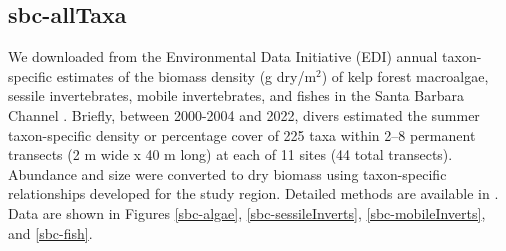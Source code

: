 \documentclass[11pt, oneside]{article}
\begin{document}
%
%


%
\subsection {sbc-allTaxa}
We downloaded from the Environmental Data Initiative (EDI) annual taxon-specific estimates of the biomass density (g dry/m$^2$) of kelp forest macroalgae, sessile invertebrates, mobile invertebrates, and fishes in the Santa Barbara Channel \citep{sbc}.
Briefly, between 2000-2004 and 2022, divers estimated the summer taxon-specific density or percentage cover of 225 taxa within 2–8 permanent transects (2 m wide x 40 m long) at each of 11 sites (44 total transects). 
Abundance and size were converted to dry biomass using taxon-specific relationships developed for the study region. 
Detailed methods are available in \citep{Harrer2013, Reed2016, sbc}.
Data are shown in Figures \ref{sbc-algae},  \ref{sbc-sessileInverts}, \ref{sbc-mobileInverts}, and \ref{sbc-fish}.
\end{document}

